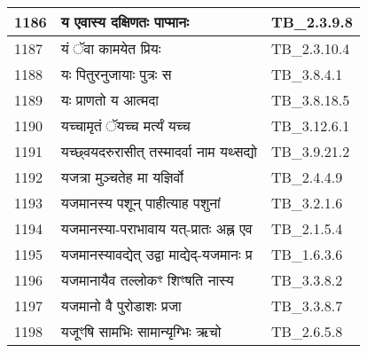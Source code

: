 \documentclass[17pt]{extarticle}
\begin{document}
\begin{longtable}{||p{0.4in}||p{4.9in}||p{0.9in}||}
    \hline
        
    1186 & य एवास्य दक्षिणतः पाप्मानः & TB\_2.3.9.8       \\
    
    \hline
        
    1187 & यं ॅवा कामयेत प्रियः & TB\_2.3.10.4       \\
    
    \hline
        
    1188 & यः पितुरनुजायाः पुत्रः स & TB\_3.8.4.1       \\
    
    \hline
        
    1189 & यः प्राणतो य आत्मदा & TB\_3.8.18.5       \\
    
    \hline
        
    1190 & यच्चामृतं ॅयच्च मर्त्यं यच्च & TB\_3.12.6.1       \\
    
    \hline
        
    1191 & यच्छ्वयदरुरासीत् तस्मादर्वा नाम यथ्सद्यो & TB\_3.9.21.2       \\
    
    \hline
        
    1192 & यजत्रा मुञ्चतेह मा यज्ञिर्वो & TB\_2.4.4.9       \\
    
    \hline
        
    1193 & यजमानस्य पशून् पाहीत्याह पशुनां & TB\_3.2.1.6       \\
    
    \hline
        
    1194 & यजमानस्या{-}पराभावाय यत्{-}प्रातः अह्न एव & TB\_2.1.5.4       \\
    
    \hline
        
    1195 & यजमानस्यावद्येत् उद्वा माद्येद्{-}यजमानः प्र & TB\_1.6.3.6       \\
    
    \hline
        
    1196 & यजमानायैव तल्लोकꣳ शिꣳषति नास्य & TB\_3.3.8.2       \\
    
    \hline
        
    1197 & यजमानो वै पुरोडाशः प्रजा & TB\_3.3.8.7       \\
    
    \hline
        
    1198 & यजूꣳषि सामभिः सामान्यृग्भिः ऋचो & TB\_2.6.5.8       \\
    

\end{longtable}
\end{document}
